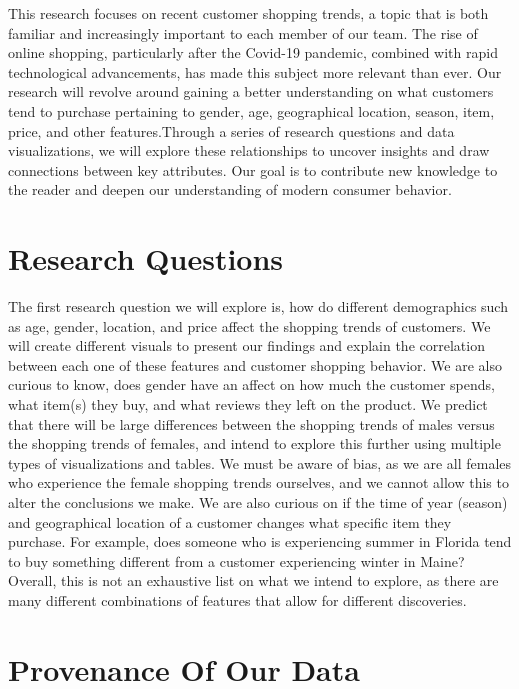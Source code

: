 \documentclass[
  letterpaper,
  DIV=11,
  numbers=noendperiod]{scrartcl}
\begin{document}
This research focuses on recent customer shopping trends, a topic that
is both familiar and increasingly important to each member of our team.
The rise of online shopping, particularly after the Covid-19 pandemic,
combined with rapid technological advancements, has made this subject
more relevant than ever. Our research will revolve around gaining a
better understanding on what customers tend to purchase pertaining to
gender, age, geographical location, season, item, price, and other
features.Through a series of research questions and data visualizations,
we will explore these relationships to uncover insights and draw
connections between key attributes. Our goal is to contribute new
knowledge to the reader and deepen our understanding of modern consumer
behavior.

\section{\texorpdfstring{\textbf{Research
Questions}}{Research Questions}}\label{research-questions}

The first research question we will explore is, how do different
demographics such as age, gender, location, and price affect the
shopping trends of customers. We will create different visuals to
present our findings and explain the correlation between each one of
these features and customer shopping behavior. We are also curious to
know, does gender have an affect on how much the customer spends, what
item(s) they buy, and what reviews they left on the product. We predict
that there will be large differences between the shopping trends of
males versus the shopping trends of females, and intend to explore this
further using multiple types of visualizations and tables. We must be
aware of bias, as we are all females who experience the female shopping
trends ourselves, and we cannot allow this to alter the conclusions we
make. We are also curious on if the time of year (season) and
geographical location of a customer changes what specific item they
purchase. For example, does someone who is experiencing summer in
Florida tend to buy something different from a customer experiencing
winter in Maine? Overall, this is not an exhaustive list on what we
intend to explore, as there are many different combinations of features
that allow for different discoveries.

\section{\texorpdfstring{\textbf{Provenance Of Our
Data}}{Provenance Of Our Data}}\label{provenance-of-our-data}
\end{document}

